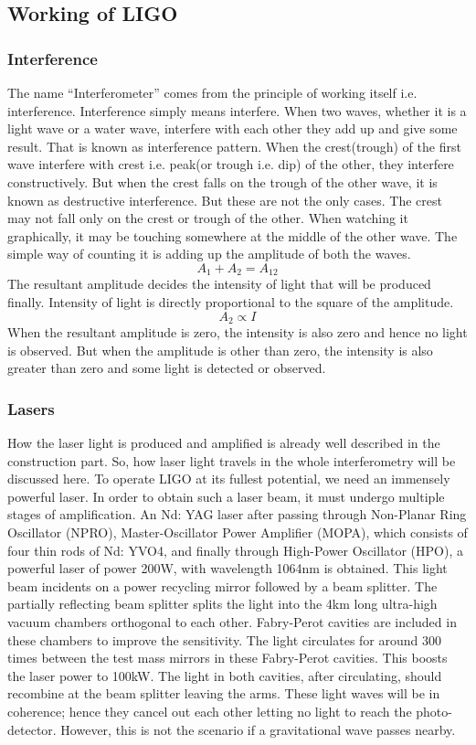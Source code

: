 \subsection{Working of LIGO}

\subsubsection{Interference}

The name “Interferometer” comes from the principle of working itself i.e. interference.  Interference simply means interfere. When two waves, whether it is a light wave or a water wave, interfere with each other they add up and give some result. That is known as interference pattern. When the crest(trough) of the first wave interfere with crest i.e. peak(or trough i.e. dip) of the other, they interfere constructively. But when the crest falls on the trough of the other wave, it is known as destructive interference. But these are not the only cases. The crest may not fall only on the crest or trough of the other. When watching it graphically, it may be touching somewhere at the middle of the other wave. The simple way of counting it is adding up the amplitude of both the waves. 
\[ A_{1} + A_{2} = A_{12} \]
The resultant amplitude decides the intensity of light that will be produced finally. Intensity of light is directly proportional to the square of the amplitude.
\[ A_{2} \propto I \]
When the resultant amplitude is zero, the intensity is also zero and hence no light is observed. But when the amplitude is other than zero, the intensity is also greater than zero and some light is detected or observed.
\subsubsection{Lasers}
How the laser light is produced and amplified is already well described in the construction part. So, how laser light travels in the whole interferometry will be discussed here. To operate LIGO at its fullest potential, we need an immensely powerful laser. In order to obtain such a laser beam, it must undergo multiple stages of amplification. An Nd: YAG laser after passing through Non-Planar Ring Oscillator (NPRO), Master-Oscillator Power Amplifier (MOPA), which consists of four thin rods of Nd: YVO4, and finally through High-Power Oscillator (HPO), a powerful laser of power 200W, with wavelength 1064nm is obtained. This light beam incidents on a power recycling mirror followed by a beam splitter. The partially reflecting beam splitter splits the light into the 4km long ultra-high vacuum chambers orthogonal to each other. Fabry-Perot cavities are included in these chambers to improve the sensitivity. The light circulates for around 300 times between the test mass mirrors in these Fabry-Perot cavities. This boosts the laser power to 100kW. 
The light in both cavities, after circulating, should recombine at the beam splitter leaving the arms. These light waves will be in coherence; hence they cancel out each other letting no light to reach the photo-detector. However, this is not the scenario if a gravitational wave passes nearby.

